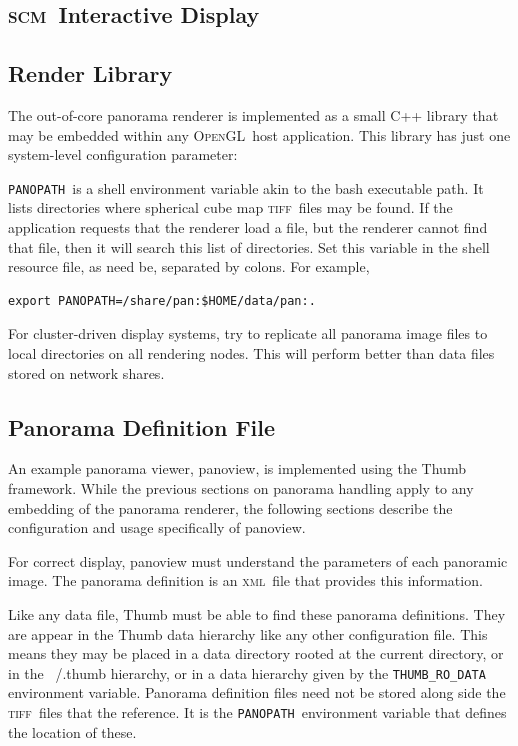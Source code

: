 \documentclass[oneside,10pt]{memoir}
\newcommand{\opengl}  {\textsc{OpenGL}}
\newcommand{\scm}     {\textsc{scm}}
\newcommand{\tiff}    {\textsc{tiff}}
\newcommand{\xml}     {\textsc{xml}}
\newcommand{\panopath}{\texttt{PANOPATH}}
\begin{document}
\begin{Spacing}{1.1}

\chapter{\scm\ Interactive Display}

\section{Render Library}

The out-of-core panorama renderer is implemented as a small C++ library that may be embedded within any \opengl\ host application. This library has just one system-level configuration parameter:

\panopath\ is a shell environment variable akin to the bash executable path. It lists directories where spherical cube map \tiff\ files may be found. If the application requests that the renderer load a file, but the renderer cannot find that file, then it will search this list of directories. Set this variable in the shell resource file, as need be, separated by colons. For example,

\begin{Verbatim}
export PANOPATH=/share/pan:$HOME/data/pan:.
\end{Verbatim}

For cluster-driven display systems, try to replicate all panorama image files to local directories on all rendering nodes. This will perform better than data files stored on network shares.

\section{Panorama Definition File}

An example panorama viewer, panoview, is implemented using the Thumb framework. While the previous sections on panorama handling apply to any embedding of the panorama renderer, the following sections describe the configuration and usage specifically of panoview.

For correct display, panoview must understand the parameters of each panoramic image. The panorama definition is an \xml\ file that provides this information.

Like any data file, Thumb must be able to find these panorama definitions. They are appear in the Thumb data hierarchy like any other configuration file. This means they may be placed in a data directory rooted at the current directory, or in the ~/.thumb hierarchy, or in a data hierarchy given by the \texttt{THUMB\_RO\_DATA} environment variable. Panorama definition files need not be stored along side the \tiff\ files that the reference. It is the \panopath\ environment variable that defines the location of these.


\end{Spacing}
\end{document}
